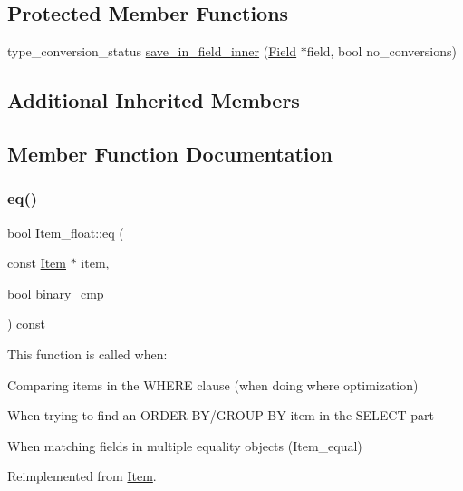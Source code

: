 \subsection*{Protected Member Functions}
\begin{DoxyCompactItemize}
\item 
type\+\_\+conversion\+\_\+status \mbox{\hyperlink{classItem__float_a8114dff591bc7627fb9280e164443783}{save\+\_\+in\+\_\+field\+\_\+inner}} (\mbox{\hyperlink{classField}{Field}} $\ast$field, bool no\+\_\+conversions)
\end{DoxyCompactItemize}
\subsection*{Additional Inherited Members}


\subsection{Member Function Documentation}
\mbox{\label{classItem__float_a448efe19e2daa5e89d66b92b82ddbfba}} 
\subsubsection{\texorpdfstring{eq()}{eq()}}
{\footnotesize\ttfamily bool Item\+\_\+float\+::eq (\begin{DoxyParamCaption}\item[{const \mbox{\hyperlink{classItem}{Item}} $\ast$}]{item,  }\item[{bool}]{binary\+\_\+cmp }\end{DoxyParamCaption}) const\hspace{0.3cm}{\ttfamily [virtual]}}

This function is called when\+:
\begin{DoxyItemize}
\item Comparing items in the W\+H\+E\+RE clause (when doing where optimization)
\item When trying to find an O\+R\+D\+ER B\+Y/\+G\+R\+O\+UP BY item in the S\+E\+L\+E\+CT part
\item When matching fields in multiple equality objects (Item\+\_\+equal) 
\end{DoxyItemize}

Reimplemented from \mbox{\hyperlink{classItem_af0957bbdb9a256de0cd29f1adcae28be}{Item}}.

